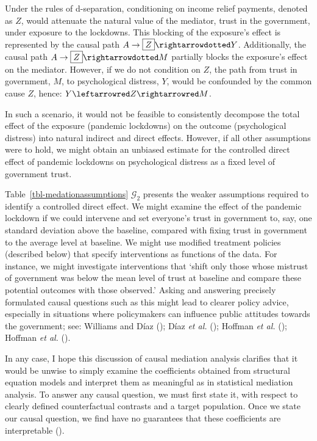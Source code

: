 \documentclass[
  single column]{article}
\begin{document}
Under the rules of d-separation, conditioning on income relief payments,
denoted as \(Z\), would attenuate the natural value of the mediator,
trust in the government, under exposure to the lockdowns. This blocking
of the exposure's effect is represented by the causal path
\(A \to \boxed{Z} \rightarrowdotted Y\). Additionally, the causal path
\(A \to \boxed{Z} \rightarrowdotted M\) partially blocks the exposure's
effect on the mediator. However, if we do not condition on \(Z\), the
path from trust in government, \(M\), to psychological distress, \(Y\),
would be confounded by the common cause \(Z\), hence:
\(Y \leftarrowred Z \rightarrowred M\).

In such a scenario, it would not be feasible to consistently decompose
the total effect of the exposure (pandemic lockdowns) on the outcome
(psychological distress) into natural indirect and direct effects.
However, if all other assumptions were to hold, we might obtain an
unbiased estimate for the controlled direct effect of pandemic lockdowns
on psychological distress as a fixed level of government trust.

Table~\ref{tbl-medationassumptions} \(\mathcal{G}_2\) presents the
weaker assumptions required to identify a controlled direct effect. We
might examine the effect of the pandemic lockdown if we could intervene
and set everyone's trust in government to, say, one standard deviation
above the baseline, compared with fixing trust in government to the
average level at baseline. We might use modified treatment policies
(described below) that specify interventions as functions of the data.
For instance, we might investigate interventions that `shift only those
whose mistrust of government was below the mean level of trust at
baseline and compare these potential outcomes with those observed.'
Asking and answering precisely formulated causal questions such as this
might lead to clearer policy advice, especially in situations where
policymakers can influence public attitudes towards the government; see:
Williams and Díaz (); Díaz \emph{et
al.} (); Hoffman \emph{et al.}
(); Hoffman \emph{et al.}
().

In any case, I hope this discussion of causal mediation analysis
clarifies that it would be unwise to simply examine the coefficients
obtained from structural equation models and interpret them as
meaningful as in statistical mediation analysis. To answer any causal
question, we must first state it, with respect to clearly defined
counterfactual contrasts and a target population. Once we state our
causal question, we find have no guarantees that these coefficients are
interpretable ().
\end{document}
